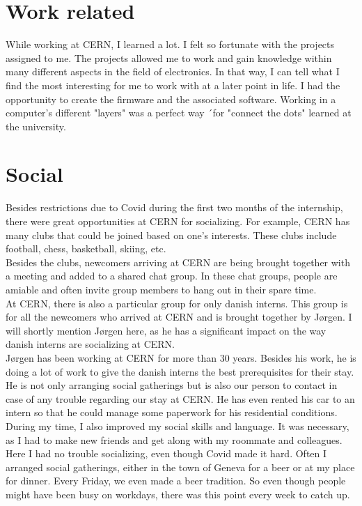 \section{Work related}

While working at CERN, I learned a lot. I felt so fortunate with the projects assigned to me. The projects allowed me to work and gain knowledge within many different aspects in the field of electronics. In that way, I can tell what I find the most interesting for me to work with at a later point in life. I had the opportunity to create the firmware and the associated software. Working in a computer's different  "layers" was a perfect way ´for "connect the dots" learned at the university. 

\section{Social}

Besides restrictions due to Covid during the first two months of the internship, there were great opportunities at CERN for socializing. For example, CERN has many clubs that could be joined based on one's interests. These clubs include football, chess, basketball, skiing, etc.\\

\noindent Besides the clubs, newcomers arriving at CERN are being brought together with a meeting and added to a shared chat group. In these chat groups, people are amiable and often invite group members to hang out in their spare time.  \\

\noindent At CERN, there is also a particular group for only danish interns. This group is for all the newcomers who arrived at CERN and is brought together by Jørgen. I will shortly mention Jørgen here, as he has a significant impact on the way danish interns are socializing at CERN. \\

\noindent Jørgen has been working at CERN for more than 30 years.
Besides his work, he is doing a lot of work to give the danish interns the best prerequisites for their stay. He is not only arranging social gatherings but is also our person to contact in case of any trouble regarding our stay at CERN. He has even rented his car to an intern so that he could manage some paperwork for his residential conditions. \\

\noindent During my time, I also improved my social skills and language. It was necessary, as I had to make new friends and get along with my roommate and colleagues. Here I had no trouble socializing, even though Covid made it hard. Often I arranged social gatherings, either in the town of Geneva for a beer or at my place for dinner. Every Friday, we even made a beer tradition. So even though people might have been busy on workdays, there was this point every week to catch up. 

